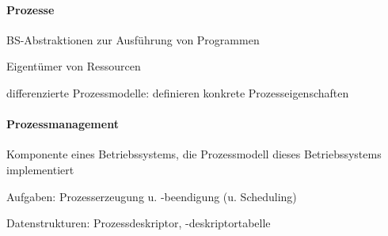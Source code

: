\documentclass[a4paper]{article}
\begin{document}
\raggedright
\begin{multicols}{3}\scriptsize
  \setlength{\premulticols}{1pt}
  \setlength{\postmulticols}{1pt}
  \setlength{\multicolsep}{1pt}
  \setlength{\columnsep}{2pt}


  \paragraph{Prozesse}
  \begin{itemize*}
    \item BS-Abstraktionen zur Ausführung von Programmen
    \item Eigentümer von Ressourcen
    \item differenzierte Prozessmodelle: definieren konkrete Prozesseigenschaften
  \end{itemize*}

  \paragraph{Prozessmanagement}
  \begin{itemize*}
    \item Komponente eines Betriebssystems, die Prozessmodell dieses Betriebssystems implementiert
    \item Aufgaben: Prozesserzeugung u. -beendigung (u. Scheduling)
    \item Datenstrukturen: Prozessdeskriptor, -deskriptortabelle
  \end{itemize*}


\end{multicols}
\end{document}

